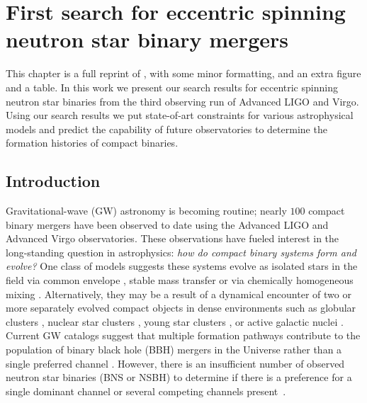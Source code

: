 \chapter{First search for eccentric spinning neutron star binary mergers}


This chapter is a full reprint of \cite{Dhurkunde:2023qoe}, with some minor formatting, and an extra figure and a table. In this work we present our search results for eccentric spinning neutron star binaries from the third observing run of Advanced LIGO and Virgo. Using our search results we put state-of-art constraints for various astrophysical models and predict the capability of future observatories to determine the formation histories of compact binaries.  


\section{Introduction}

Gravitational-wave (GW) astronomy is becoming routine; nearly $100$ compact binary mergers have been observed to date \cite{Nitz:2021zwj,LIGOScientific:2021djp,Olsen:2022pin} using the Advanced LIGO  \cite{LIGOScientific:2014pky} and Advanced Virgo \cite{Acernese:2015gua} observatories. These observations have fueled interest in the long-standing question in astrophysics: \textit{how do compact binary systems form and evolve?} One class of models suggests these systems evolve as isolated stars in the field via common envelope \cite{Belczynski:2001uc, Mennekens:2013dja, Chu:2021evh}, stable mass transfer \cite{Klencki:2021hxe,vandenHeuvel:2017pwp} or via chemically homogeneous mixing \cite{Mandel:2015qlu, Marchant:2016wow}. Alternatively, they may be a result of a dynamical encounter of two or more separately evolved compact objects in dense environments such as globular clusters \cite{Vesperini:2010zi,Fragione:2018vty, Rodriguez:2017pec,Sedda:2020wzl}, nuclear star clusters \cite{Fragione:2018yrb, Wang:2020jsx}, young star clusters \cite{Banerjee:2020qub, Santoliquido:2020bry}, or active galactic nuclei \cite{Bartos:2016dgn, Tagawa:2020qll}.
Current GW catalogs suggest that multiple formation pathways contribute to the population of binary black hole (BBH) mergers in the Universe rather than a single preferred channel \cite{Zevin:2020gbd,KAGRA:2021duu}. However, there is an insufficient number of observed neutron star binaries (BNS or NSBH) to determine if there is a preference for a single dominant channel or several competing channels present~\cite{KAGRA:2021duu,Belczynski:2017mqx}.

